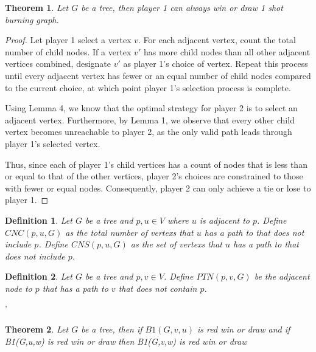 \documentclass{article}
\newtheorem{theorem}{Theorem}
\newtheorem{definition}{Definition}
\begin{document}
\begin{theorem}
Let \(G\) be a tree, then player 1 can always win or draw 1 shot burning graph.
\end{theorem}

\begin{proof}
Let player 1 select a vertex \(v\). For each adjacent vertex, count the total number of child nodes. If a vertex \(v'\) has more child nodes than all other adjacent vertices combined, designate \(v'\) as player 1's choice of vertex. Repeat this process until every adjacent vertex has fewer or an equal number of child nodes compared to the current choice, at which point player 1's selection process is complete.

Using Lemma 4, we know that the optimal strategy for player 2 is to select an adjacent vertex. Furthermore, by Lemma 1, we observe that every other child vertex becomes unreachable to player 2, as the only valid path leads through player 1’s selected vertex.

Thus, since each of player 1's child vertices has a count of nodes that is less than or equal to that of the other vertices, player 2’s choices are constrained to those with fewer or equal nodes. Consequently, player 2 can only achieve a tie or lose to player 1.
\end{proof}

\begin{definition}
Let \(G\) be a tree and \( p,u \in V \) where \(u\) is adjacent to \(p\). 
Define \(CNC(p,u,G)\) as the total number of vertexs that \(u\) has a path to that does not include \(p\). 
Define \(CNS(p,u,G)\) as the set of vertexs that \(u\) has a path to that does not include \(p\). 
\end{definition}

\begin{definition}
Let \(G\) be a tree and \( p,v \in V \). 
Define \(PTN(p,v,G)\) be the adjacent node to \(p\) that has a path to \(v\) that does not contain \(p\).
\end{definition}'

\begin{theorem}
Let \(G\) be a tree, then if \(B1(G,v,u)\) is red win or draw and if B1(G,u,w) is red win or draw then B1(G,v,w) is red win or draw 
\end{theorem}
\end{document}

